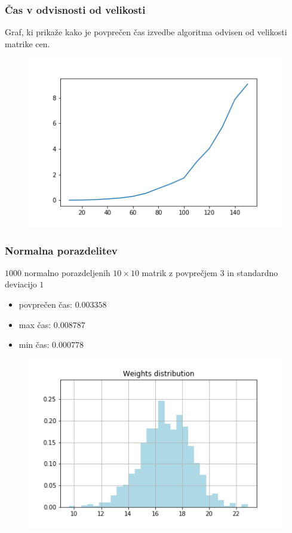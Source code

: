 \documentclass{beamer}
\begin{document}
\begin{frame}
    \frametitle{Čas v odvisnosti od velikosti}
    \begin{block}{}
        Graf, ki prikaže kako je povprečen čas izvedbe algoritma odvisen od velikosti matrike cen.
    \end{block}
    \begin{figure}[htbp]
        \centerline{\includegraphics[scale=0.40]{algorithm_time.png}}
    \end{figure}
\end{frame}

\begin{frame}
    \frametitle{Normalna porazdelitev}
    \begin{block}{}
        $1000$ normalno porazdeljenih $10 \times 10$ matrik z povprečjem $3$ in
        standardno deviacijo $1$
        \begin{itemize}
            \item povprečen čas: $0.003358$
            \item max čas: $0.008787$
            \item min čas: $0.000778$
        \end{itemize}
    \end{block}
    \begin{figure}[htbp]
        \centerline{\includegraphics[scale=0.40]{picture1004min.png}}
    \end{figure}
\end{frame}
\end{document}
